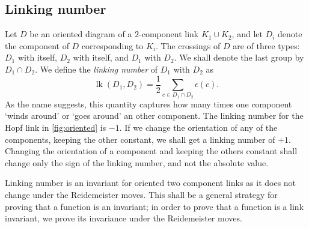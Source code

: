 \subsection{Linking number}

Let \(D\) be an oriented diagram of a \(2\)-component link \(K_1 \cup K_2\), and let \(D_i\) denote the component of \(D\) corresponding to \(K_i\). The crossings of \(D\) are of three types: \(D_1\) with itself, \(D_2\) with itself, and \(D_1\) with \(D_2\). We shall denote the last group by \(D_1 \cap D_2\). We define the \textit{linking number} of \(D_1\) with \(D_2\) as \[\operatorname{lk}(D_1, D_2) = \frac{1}{2} \sum_{c \in D_1 \cap D_2} \epsilon(c).\] As the name suggests, this quantity captures how many times one component `winds around' or `goes around' an other component. The linking number for the Hopf link in \cref{fig:oriented} is \(-1\). If we change the orientation of any of the components, keeping the other constant, we shall get a linking number of \(+1\). Changing the orientation of a component and keeping the others constant shall change only the sign of the linking number, and not the absolute value.

Linking number is an invariant for oriented two component links as it does not change under the Reidemeister moves. This shall be a general strategy for proving that a function is an invariant; in order to prove that a function is a link invariant, we prove its invariance under the Reidemeister moves.

